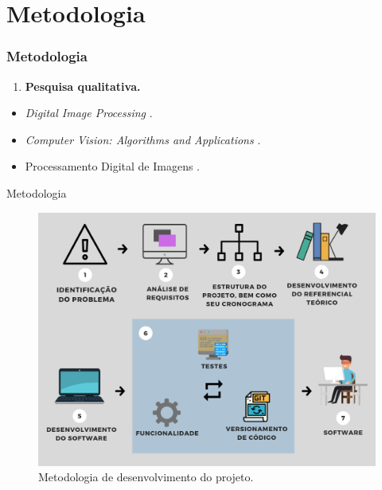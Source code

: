 \section{Metodologia}
\begin{frame}
\frametitle{Metodologia}
\label{metodologia}

\begin{enumerate}
    \item \textbf{Pesquisa qualitativa.}
\end{enumerate}


\begin{itemize}
    \item \textit{Digital Image Processing} \cite{GONZALEZ2002}.
    \item \textit{Computer Vision: Algorithms and Applications} \cite{SZELISKI2010}.
    \item Processamento Digital de Imagens \cite{FILHO1999}.
\end{itemize}
\end{frame}

\begin{frame}{Metodologia}
\begin{figure}
    \centering
    \caption{\label{fig_metodologia-desenvolvimento-tcc}Metodologia de desenvolvimento do projeto.}
    \includegraphics[scale=0.3]{04-SLIDE_METODOLOGIA/metodologia-desenvolvimento-tcc.png}
\end{figure}
\end{frame}